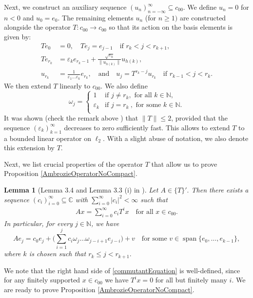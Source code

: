 \documentclass[a4paper,12pt]{article}
\newtheorem{lemma}[thm]{Lemma}
\theoremstyle{definition}
\numberwithin{equation}{section}
\numberwithin{thm}{section}
\newcommand{\N}{\mathbb{N}}
\newcommand{\C}{\mathbb{C}}
\begin{document}
Next, we construct an auxiliary sequence $(u_n)_{n=-\infty}^\infty \subseteq c_{00}$. We define $u_n = 0$ for $n<0$ and $u_0=e_0$. The remaining elements $u_n$ (for $n\geq 1)$ are constructed alongside the operator $T:c_{00} \rightarrow c_{00}$ so that its action on the basis elements is given by:
\begin{align*}
Te_0 &= 0, \quad Te_j = e_{j-1} \quad \text{if } r_k < j < r_{k+1},\\
Te_{r_k} &= \varepsilon_k e_{r_k-1} + \frac{\sqrt{\varepsilon_k}}{\|u_{h(k)}\|}u_{h(k)},\\
u_{r_k} &= \frac{1}{\varepsilon_1\dots \varepsilon_k}e_{r_k}, \quad\text{and}\quad
u_j = T^{r_k-j} u_{r_k}\quad \text{if } r_{k-1}<j<r_k.
\end{align*}
We then extend $T$ linearly to $c_{00}$. We also define
$$   
\omega_j =
     \begin{cases}
       1 &\text{if } j \neq r_k ,\text{ for all } k\in\N,\\
       \varepsilon_k &\text{if } j=r_k~,\text{ for some } k\in\N.\\
     \end{cases}
$$
It was shown (check the remark above \cite[Lemma 3.3]{Ambrozie}) that $\|T\|\leq 2$, provided that the sequence $(\varepsilon_k)_{k=1}^\infty$ decreases to zero sufficiently fast. This allows to extend $T$ to a bounded linear operator on $\ell_2$. With a slight abuse of notation, we also denote this extension by $T$. 

Next, we list crucial properties of the operator $T$ that allow us to prove Proposition \ref{AmbrozieOperatorNoCompact}.
\begin{lemma}[Lemma 3.4 and Lemma 3.3 (i) in \cite{Ambrozie}]
\label{commutantofAmbrozie}
Let $A\in \{T\}'.$ Then there exists a sequence $(c_i)_{i=0}^\infty\subseteq \C$ with $\sum_{i=0}^\infty |c_i|^2 <\infty$ such that 
\begin{align}
\label{commutantEquation}
Ax = \sum_{i=0}^\infty c_i T^i x \quad \text{for all } x\in c_{00}.
\end{align}
In particular, for every $j\in \N$, we have
$$Ae_j = c_0e_j+ \Big(\sum_{i=1}^j c_i\omega_j\dots \omega_{j-i+1}e_{j-i}\Big) + v \quad \text{for some } v\in \operatorname{span}\{e_0,\dots,e_{k-1}\},$$
where $k$ is chosen such that $r_k\leq j< r_{k+1}.$
\end{lemma}

We note that the right hand side of \eqref{commutantEquation} is well-defined, since for any finitely supported $x\in c_{00}$ we have $T^ix=0$ for all but finitely many $i$. We are ready to prove Proposition \ref{AmbrozieOperatorNoCompact}.
\end{document}

